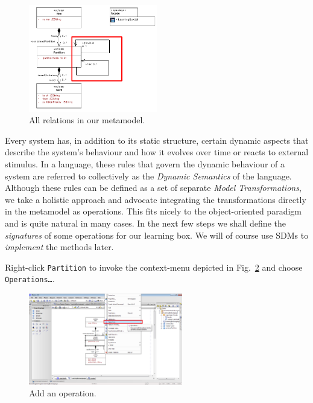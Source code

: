 \begin{figure}[htbp]
	\centering
  \includegraphics[width=0.5\textwidth]{pics/memBoxBilder/memBox34.pdf}
	\caption{All relations in our metamodel.}
	\label{fig:ereferences_all}  
\end{figure}

Every system has, in addition to its static structure, certain dynamic aspects
that describe the system's behaviour and how it evolves over time or reacts to
external stimulus.
In a language, these rules that govern the dynamic behaviour of a system are
referred to collectively as the \emph{Dynamic Semantics} of the language.  
Although these rules can be defined as a set of separate \emph{Model
Transformations}, we take a holistic approach and advocate integrating the
transformations directly in the metamodel as operations.
This fits nicely to the object-oriented paradigm and is quite natural in many
cases.  In the next few steps we shall define the \emph{signatures} of some
operations for our learning box.  We will of course use SDMs to \emph{implement}
the methods later.

Right-click \texttt{Partition} to invoke the context-menu depicted in
Fig.~\ref{fig:add_operation} and choose \texttt{Operations\ldots}.

\begin{figure}[htbp]
	\centering
  \includegraphics[width=0.6\textwidth]{pics/memBoxBilder/memBox35.png}
	\caption{Add an operation.}
	\label{fig:add_operation}
\end{figure}
 
